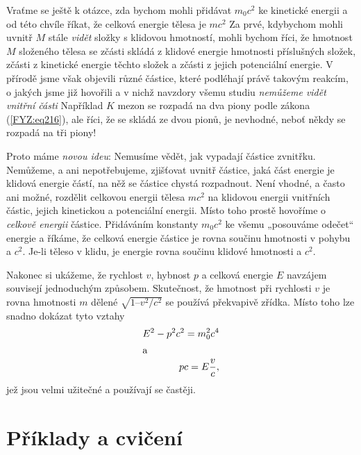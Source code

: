 {    Vraťme se ještě k otázce, zda bychom mohli přidávat \(m_0c^2\) ke kinetické energii a od této 
    chvíle říkat, že celková energie tělesa je \(mc^2\) Za prvé, kdybychom mohli uvnitř \(M\) stále 
    \emph{vidět} složky s klidovou hmotností, mohli bychom říci, že hmotnost \(M\) složeného tělesa 
    se zčásti skládá z klidové energie hmotnosti příslušných složek, zčásti z kinetické energie 
    těchto složek a zčásti z jejich potenciální energie. V přírodě jsme však objevili různé 
    částice, které podléhají právě takovým reakcím, o jakých jsme již hovořili a v nichž navzdory 
    všemu studiu \emph{nemůžeme vidět vnitřní části} Například \(K\) mezon se rozpadá na dva piony 
    podle zákona (\ref{FYZ:eq216}), ale říci, že se skládá ze dvou pionů, je nevhodné, neboť někdy 
    se rozpadá na tři piony!
    
    Proto máme \emph{novou ideu}: Nemusíme vědět, jak vypadají částice zvnitřku. Nemůžeme, a ani 
    nepotřebujeme, zjišťovat uvnitř částice, jaká část energie je klidová energie částí, na něž se 
    částice chystá rozpadnout. Není vhodné, a často ani možné, rozdělit celkovou energii tělesa 
    \(mc^2\) na klidovou energii vnitřních částic, jejich kinetickou a potenciální energii. Místo 
    toho prostě hovoříme o \emph{celkově energii} částice. Přidáváním konstanty \(m_0c^2\) ke všemu 
    „posouváme odečet“ energie a říkáme, že celková energie částice je rovna součinu hmotnosti v 
    pohybu a \(c^2\). Je-li těleso v klidu, je energie rovna součinu klidové hmotnosti a \(c^2\).
    
    Nakonec si ukážeme, že rychlost \(v\), hybnost \(p\) a celková energie \(E\) navzájem souvisejí 
    jednoduchým způsobem. Skutečnost, že hmotnost při rychlosti \(v\) je rovna hmotnosti \(m\) 
    dělené \(\sqrt{ 1 – v^2/c^2}\) se používá překvapivě zřídka. Místo toho lze snadno dokázat tyto 
    vztahy
    \begin{align}
      E^2 - p^2c^2 = m_0^2c^4   \label{FYZ:eq218}  \\
      \shortintertext{a}
      pc = E\frac{v}{c},        \label{FYZ:eq219}
    \end{align}
    jež jsou velmi užitečné a používají se častěji. 
    
  \section{Příklady a cvičení}\label{fyz:IchapXVIsecVI}

} %
\printbibliography[heading=subbibliography]
